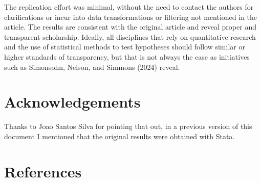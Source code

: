 \documentclass[letterpaper,twoside,12pt]{article}
\begin{document}
The replication effort was minimal, without the need to contact the
authors for clarifications or incur into data transformations or
filtering not mentioned in the article. The results are consistent with
the original article and reveal proper and transparent scholarship.
Ideally, all disciplines that rely on quantitative research and the use
of statistical methods to test hypotheses should follow similar or
higher standards of transparency, but that is not always the case as
initiatives such as Simonsohn, Nelson, and Simmons (2024) reveal.

\section{Acknowledgements}\label{acknowledgements}

Thanks to Joao Santos Silva for pointing that out, in a previous version
of this document I mentioned that the original results were obtained
with Stata.

\section*{References}\label{references}
\end{document}
